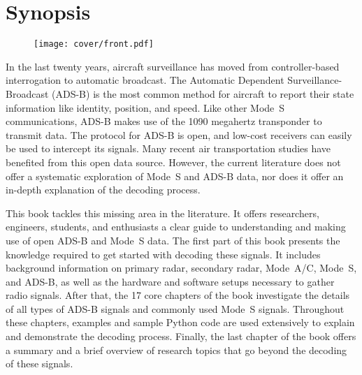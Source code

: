 \chapter*{Synopsis}


\begin{figure}[ht]
    \centering
    \texttt{[image: cover/front.pdf]}
\end{figure}


In the last twenty years, aircraft surveillance has moved from controller-based interrogation to automatic broadcast. The Automatic Dependent Surveillance-Broadcast (ADS-B) is the most common method for aircraft to report their state information like identity, position, and speed. Like other Mode~S communications, ADS-B makes use of the 1090 megahertz transponder to transmit data. The protocol for ADS-B is open, and low-cost receivers can easily be used to intercept its signals. Many recent air transportation studies have benefited from this open data source. However, the current literature does not offer a systematic exploration of Mode~S and ADS-B data, nor does it offer an in-depth explanation of the decoding process.

This book tackles this missing area in the literature. It offers researchers, engineers, students, and enthusiasts a clear guide to understanding and making use of open ADS-B and Mode~S data. The first part of this book presents the knowledge required to get started with decoding these signals. It includes background information on primary radar, secondary radar, Mode~A/C, Mode~S, and ADS-B, as well as the hardware and software setups necessary to gather radio signals. After that, the 17 core chapters of the book investigate the details of all types of ADS-B signals and commonly used Mode~S signals. Throughout these chapters, examples and sample Python code are used extensively to explain and demonstrate the decoding process. Finally, the last chapter of the book offers a summary and a brief overview of research topics that go beyond the decoding of these signals.
